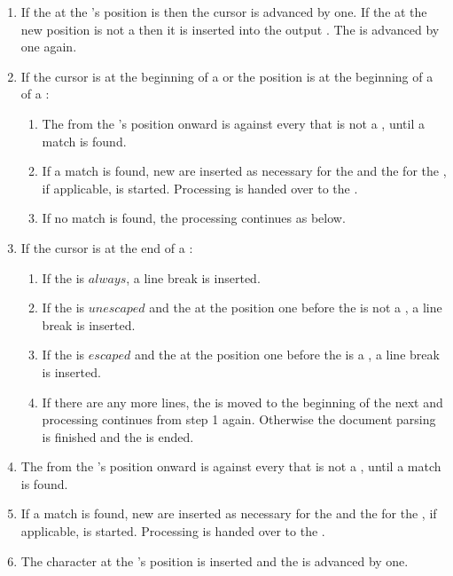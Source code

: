 \begin{enumerate}
\item If the  at the 's position is  then the cursor is advanced by one. If the  at the new position is not a  then it is inserted into the output . The  is advanced by one again.
\item If the cursor is at the beginning of a  or the position is at the beginning of a  of a :
  \begin{enumerate}
  \item The  from the 's position onward is  against every  that is not a , until a match is found.
  \item If a match is found, new  are inserted as necessary for the  and the  for the , if applicable, is started. Processing is handed over to the .
  \item If no match is found, the processing continues as below.
  \end{enumerate}
\item If the cursor is at the end of a :
  \begin{enumerate}
  \item If the  is \inline$always$, a line break is inserted.
  \item If the  is \inline$unescaped$ and the  at the position one before the  is not a , a line break is inserted.
  \item If the  is \inline$escaped$ and the  at the position one before the  is a , a line break is inserted.
  \item If there are any more lines, the  is moved to the beginning of the next  and processing continues from step 1 again. Otherwise the document parsing is finished and the   is ended.
  \end{enumerate}
\item The  from the 's position onward is  against every  that is not a , until a match is found.
\item If a match is found, new  are inserted as necessary for the  and the  for the , if applicable, is started. Processing is handed over to the .
\item The character at the 's position is inserted and the  is advanced by one.
\end{enumerate}

